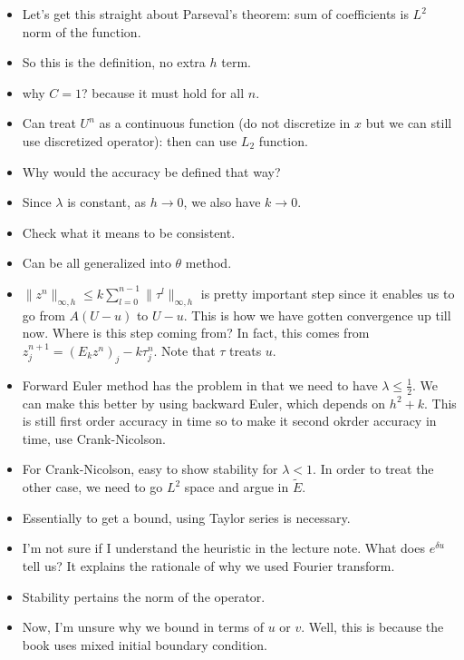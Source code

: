 \documentclass{article}
\theoremstyle{remark}
\begin{document}
\begin{itemize}
\item Let's get this straight about Parseval's theorem: sum of coefficients is $L^2$ norm of the function.
\item So this is the definition, no extra $h$ term.
\item why $C=1$? because it must hold for all $n$.
\item Can treat $U^n$ as a continuous function (do not discretize in $x$ but we can still use discretized operator): then can use $L_2$ function.
\item Why would the accuracy be defined that way?
\item Since $\lambda$ is constant, as $h\to 0$, we also have $k\to 0$.
\item Check what it means to be consistent.
\item Can be all generalized into $\theta$ method.
\item $\lVert z^n\rVert_{\infty,h}\leq k\sum^{n-1}_{l=0}\lVert \tau^l\rVert_{\infty,h}$ is pretty important step since it enables us to go from $A(U-u)$ to $U-u$. This is how we have gotten convergence up till now. Where is this step coming from? In fact, this comes from $z_{j}^{n+1}=(E_kz^n)_j-k\tau^n_j$. Note that $\tau$ treats $u$.
\item Forward Euler method has the problem in that we need to have $\lambda\leq \frac12$. We can make this better by using backward Euler, which depends on $h^2+k$. This is still first order accuracy in time so to make it second okrder accuracy in time, use Crank-Nicolson.
\item For Crank-Nicolson, easy to show stability for $\lambda<1$. In order to treat the other case, we need to go $L^2$ space and argue in $\tilde E$.
\item Essentially to get a bound, using Taylor series is necessary.
\item I'm not sure if I understand the heuristic in the lecture note. What does $e^{\delta u}$ tell us? It explains the rationale of why we used Fourier transform.
\item Stability pertains the norm of the operator. 
\item Now, I'm unsure why we bound in terms of $u$ or $v$. Well, this is because the book uses mixed initial boundary condition. 













\end{itemize}
\end{document}
